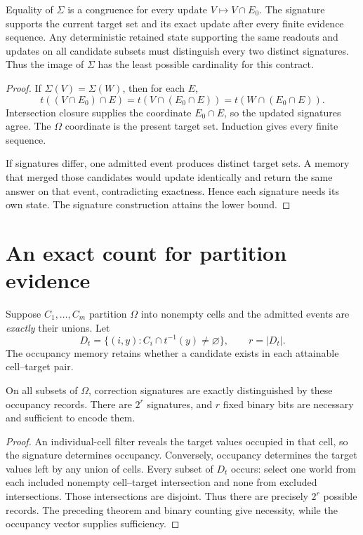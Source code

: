 \begin{theorem}\label{r:memory}
Equality of $\Sigma$ is a congruence for every update $V\mapsto V\cap E_0$. The signature supports the current target set and its exact update after every finite evidence sequence. Any deterministic retained state supporting the same readouts and updates on all candidate subsets must distinguish every two distinct signatures. Thus the image of $\Sigma$ has the least possible cardinality for this contract.
\end{theorem}
\begin{proof}
If $\Sigma(V)=\Sigma(W)$, then for each $E$,
\[
t((V\cap E_0)\cap E)=t(V\cap(E_0\cap E))=t(W\cap(E_0\cap E)).
\]
Intersection closure supplies the coordinate $E_0\cap E$, so the updated signatures agree. The $\Omega$ coordinate is the present target set. Induction gives every finite sequence.

If signatures differ, one admitted event produces distinct target sets. A memory that merged those candidates would update identically and return the same answer on that event, contradicting exactness. Hence each signature needs its own state. The signature construction attains the lower bound.
\end{proof}

\section{An exact count for partition evidence}
Suppose $C_1,\ldots,C_m$ partition $\Omega$ into nonempty cells and the admitted events are \emph{exactly} their unions. Let
\[
D_t=\{(i,y): C_i\cap t^{-1}(y)\ne\varnothing\},\qquad r=|D_t|.
\]
The occupancy memory retains whether a candidate exists in each attainable cell--target pair.

\begin{corollary}\label{r:occupancy}
On all subsets of $\Omega$, correction signatures are exactly distinguished by these occupancy records. There are $2^r$ signatures, and $r$ fixed binary bits are necessary and sufficient to encode them.
\end{corollary}
\begin{proof}
An individual-cell filter reveals the target values occupied in that cell, so the signature determines occupancy. Conversely, occupancy determines the target values left by any union of cells. Every subset of $D_t$ occurs: select one world from each included nonempty cell--target intersection and none from excluded intersections. Those intersections are disjoint. Thus there are precisely $2^r$ possible records. The preceding theorem and binary counting give necessity, while the occupancy vector supplies sufficiency.
\end{proof}

